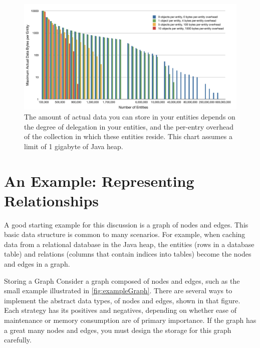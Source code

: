 \begin{figure}
\centering
	\includegraphics[width=\textwidth]{part4/Figures/maxActualData}
	\caption{The amount of actual data you can store in your entities depends on
	the degree of delegation in your entities, and the per-entry overhead of the collection in which these entities
	reside. This chart assumes a limit of 1 gigabyte of Java heap.}
\end{figure}

\section{An Example: Representing Relationships}

A good starting example for this discussion is a graph of nodes and edges. This
basic data structure is common to many scenarios. For example, when caching
data from a relational database in the Java heap, the entities (rows in a
database table) and relations (columns that contain indices into tables) become
the nodes and edges in a graph.

\begin{example}{Storing a Graph}
Consider a graph composed of nodes and edges, such as the small
example illustrated in  \autoref{fig:exampleGraph}. There are several ways to
implement the abstract data types, of nodes and edges, shown in that figure.
Each strategy has its positives and negatives, depending on whether ease of
maintenance or memory consumption are of primary importance.
If the graph has a great many nodes and edges, you must design the storage
for this graph carefully.
\end{example}

